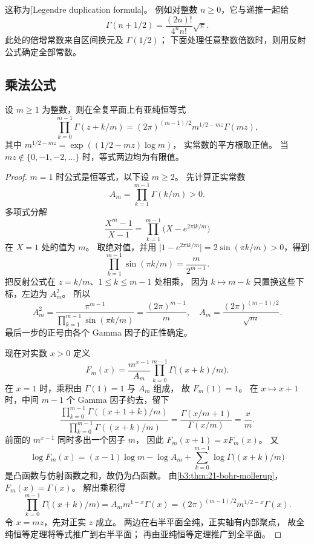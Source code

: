这称为[Legendre duplication formula]。
例如对整数 \(n\ge0\)，它与递推一起给
\[
 \Gamma(n+1/2)=\frac{(2n)!}{4^n n!}\sqrt\pi.
\]
此处的倍增常数来自区间换元及 \(\Gamma(1/2)\)；
下面处理任意整数倍数时，则用反射公式确定全部常数。

\subsection{乘法公式}
\label{b3:subsec:210403}

\begin{theorem}\label{b3:thm:21-multiplication}
设 \(m\ge1\) 为整数，则在全复平面上有亚纯恒等式
\begin{equation}\label{b3:eq:21-multiplication}
 \prod_{k=0}^{m-1}\Gamma(z+k/m)
 =(2\pi)^{(m-1)/2}m^{1/2-mz}\Gamma(mz),
\end{equation}
其中 \(m^{1/2-mz}=\exp((1/2-mz)\log m)\)，
实常数的平方根取正值。
当 \(mz\notin\{0,-1,-2,\ldots\}\) 时，等式两边均为有限值。
\end{theorem}
\begin{proof}
\(m=1\) 时公式是恒等式，以下设 \(m\ge2\)。
先计算正实常数
\[
 A_m=\prod_{k=1}^{m-1}\Gamma(k/m)>0.
\]
多项式分解
\[
 \frac{X^m-1}{X-1}
 =\prod_{k=1}^{m-1}\bigl(X-e^{2\pi\mathrm ik/m}\bigr)
\]
在 \(X=1\) 处的值为 \(m\)。
取绝对值，并用
\(\lvert1-e^{2\pi\mathrm ik/m}\rvert=2\sin(\pi k/m)>0\)，得到
\[
 \prod_{k=1}^{m-1}\sin(\pi k/m)=\frac{m}{2^{m-1}}.
\]
把反射公式在 \(z=k/m\)、\(1\le k\le m-1\) 处相乘，
因为 \(k\mapsto m-k\) 只置换这些下标，左边为 \(A_m^2\)。
所以
\[
 A_m^2=\frac{\pi^{m-1}}{\prod_{k=1}^{m-1}\sin(\pi k/m)}
       =\frac{(2\pi)^{m-1}}m,\quad
 A_m=\frac{(2\pi)^{(m-1)/2}}{\sqrt m}.
\]
最后一步的正号由各个 Gamma 因子的正性确定。

现在对实数 \(x>0\) 定义
\[
 F_m(x)=\frac{m^{x-1}}{A_m}
        \prod_{k=0}^{m-1}\Gamma\bigl((x+k)/m\bigr).
\]
在 \(x=1\) 时，乘积由 \(\Gamma(1)=1\) 与 \(A_m\) 组成，
故 \(F_m(1)=1\)。
在 \(x\mapsto x+1\) 时，中间 \(m-1\) 个 Gamma 因子约去，留下
\[
 \frac{\prod_{k=0}^{m-1}\Gamma((x+1+k)/m)}
      {\prod_{k=0}^{m-1}\Gamma((x+k)/m)}
 =\frac{\Gamma(x/m+1)}{\Gamma(x/m)}=\frac xm.
\]
前面的 \(m^{x-1}\) 同时多出一个因子 \(m\)，
因此 \(F_m(x+1)=xF_m(x)\)。
又
\[
 \log F_m(x)=(x-1)\log m-\log A_m
       +\sum_{k=0}^{m-1}\log\Gamma\bigl((x+k)/m\bigr)
\]
是凸函数与仿射函数之和，故仍为凸函数。
由\cref{b3:thm:21-bohr-mollerup}，\(F_m(x)=\Gamma(x)\)。
解出乘积得
\[
 \prod_{k=0}^{m-1}\Gamma\bigl((x+k)/m\bigr)
 =A_m m^{1-x}\Gamma(x)
 =(2\pi)^{(m-1)/2}m^{1/2-x}\Gamma(x).
\]
令 \(x=mz\)，先对正实 \(z\) 成立。
两边在右半平面全纯，正实轴有内部聚点，
故全纯恒等定理将等式推广到右半平面；
再由亚纯恒等定理推广到全平面。
\end{proof}

